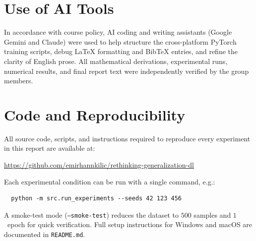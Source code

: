 \documentclass[12pt,a4paper]{article}
\theoremstyle{definition}
\theoremstyle{remark}
\begin{document}
\section*{Use of AI Tools}

In accordance with course policy, AI coding and writing assistants (Google Gemini and Claude) were used to help structure the cross-platform PyTorch training scripts, debug LaTeX formatting and BibTeX entries, and refine the clarity of English prose. All mathematical derivations, experimental runs, numerical results, and final report text were independently verified by the group members.

\section{Code and Reproducibility}
\label{sec:code}

All source code, scripts, and instructions required to reproduce every
experiment in this report are available at:

\begin{center}
  \url{https://github.com/emirhannkilic/rethinking-generalization-dl}
\end{center}

Each experimental condition can be run with a single command, e.g.:
\begin{verbatim}
  python -m src.run_experiments --seeds 42 123 456
\end{verbatim}
A smoke-test mode (\texttt{--smoke-test}) reduces the dataset to $500$ samples and
$1$~epoch for quick verification. Full setup instructions for Windows and macOS
are documented in \texttt{README.md}.

\clearpage
\printbibliography
\end{document}
